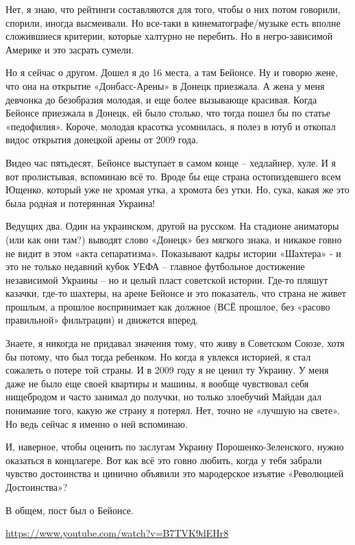 Нет, я знаю, что рейтинги составляются для того, чтобы о них потом говорили,
спорили, иногда высмеивали. Но все-таки в кинематографе/музыке есть вполне
сложившиеся критерии, которые халтурно не перебить. Но в негро-зависимой
Америке и это засрать сумели.

Но я сейчас о другом. Дошел я до 16 места, а там Бейонсе. Ну и говорю жене, что
она на открытие «Донбасс-Арены» в Донецк приезжала. А жена у меня девчонка до
безобразия молодая, и еще более вызывающе красивая. Когда Бейонсе приезжала в
Донецк, ей было столько, что тогда пошел бы по статье «педофилия». Короче,
молодая красотка усомнилась, я полез в ютуб и откопал видос открытия донецкой
арены от 2009 года.

Видео час пятьдесят, Бейонсе выступает в самом конце – хедлайнер, хуле. И я вот
пролистывая, вспоминаю всё то. Вроде бы еще страна остопиздевшего всем Ющенко,
который уже не хромая утка, а хромота без утки. Но, сука, какая же это была
родная и потерянная Украина!

Ведущих два. Один на украинском, другой на русском. На стадионе аниматоры (или
как они там?) выводят слово «Донецк» без мягкого знака, и никакое говно не
видит в этом «акта сепаратизма». Показывают кадры истории «Шахтера» - и это не
только недавний кубок УЕФА – главное футбольное достижение независимой Украины
– но и целый пласт советской истории. Где-то пляшут казачки, где-то шахтеры, на
арене Бейонсе и это показатель, что страна не живет прошлым, а прошлое
воспринимает как должное (ВСЁ прошлое, без «расово правильной» фильтрации) и
движется вперед.

Знаете, я никогда не придавал значения тому, что живу в Советском Союзе, хотя
бы потому, что был тогда ребенком. Но когда я увлекся историей, я стал сожалеть
о потере той страны. И в 2009 году я не ценил ту Украину. У меня даже не было
еще своей квартиры и машины, я вообще чувствовал себя нищебродом и часто
занимал до получки, но только злоебучий Майдан дал понимание того, какую же
страну я потерял. Нет, точно не «лучшую на свете». Но ведь сейчас я именно о
ней вспоминаю.

И, наверное, чтобы оценить по заслугам Украину Порошенко-Зеленского, нужно
оказаться в концлагере. Вот как всё это говно любить, когда у тебя забрали
чувство достоинства и цинично объявили это мародерское изъятие «Революцией
Достоинства»?

В общем, пост был о Бейонсе.  

\url{https://www.youtube.com/watch?v=B7TVK9dEHr8}
